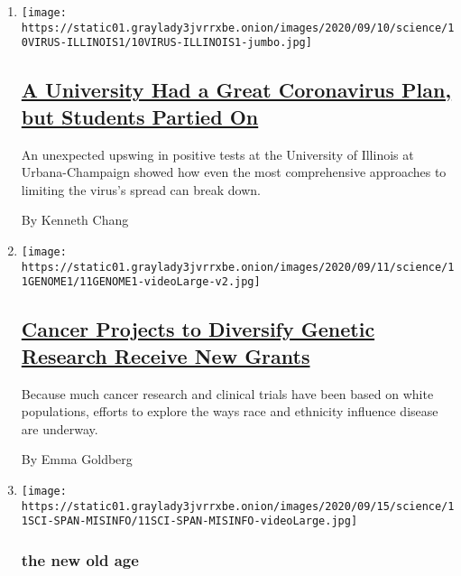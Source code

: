 \begin{enumerate}
\def\labelenumi{\arabic{enumi}.}
\item
  \texttt{[image: https://static01.graylady3jvrrxbe.onion/images/2020/09/10/science/10VIRUS-ILLINOIS1/10VIRUS-ILLINOIS1-jumbo.jpg]}

  \hypertarget{a-university-had-a-great-coronavirus-plan-but-students-partied-on}{%
  \subsection{\texorpdfstring{\href{/2020/09/10/health/university-illinois-covid.html}{A
  University Had a Great Coronavirus Plan, but Students Partied
  On}}{A University Had a Great Coronavirus Plan, but Students Partied On}}\label{a-university-had-a-great-coronavirus-plan-but-students-partied-on}}

  An unexpected upswing in positive tests at the University of Illinois
  at Urbana-Champaign showed how even the most comprehensive approaches
  to limiting the virus's spread can break down.

  By Kenneth Chang
\item
  \texttt{[image: https://static01.graylady3jvrrxbe.onion/images/2020/09/11/science/11GENOME1/11GENOME1-videoLarge-v2.jpg]}

  \hypertarget{cancer-projects-to-diversify-genetic-research-receive-new-grants}{%
  \subsection{\texorpdfstring{\href{/2020/09/11/science/genetic-cancer-research-race.html}{Cancer
  Projects to Diversify Genetic Research Receive New
  Grants}}{Cancer Projects to Diversify Genetic Research Receive New Grants}}\label{cancer-projects-to-diversify-genetic-research-receive-new-grants}}

  Because much cancer research and clinical trials have been based on
  white populations, efforts to explore the ways race and ethnicity
  influence disease are underway.

  By Emma Goldberg
\item
  \texttt{[image: https://static01.graylady3jvrrxbe.onion/images/2020/09/15/science/11SCI-SPAN-MISINFO/11SCI-SPAN-MISINFO-videoLarge.jpg]}

  \hypertarget{the-new-old-age}{%
  \subsubsection{the new old age}\label{the-new-old-age}}


\end{enumerate}
